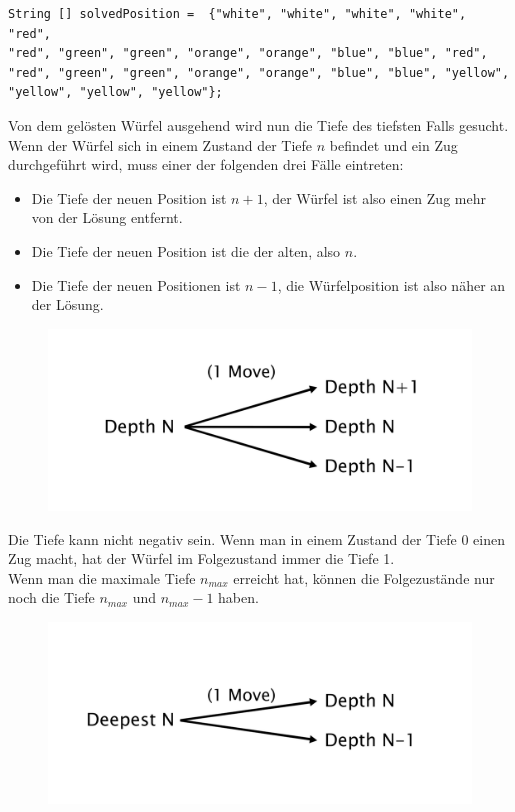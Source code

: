 \documentclass[12pt,a4paper, usenames, dvipsnames]{scrartcl}
\begin{document}
\begin{verbatim}
String [] solvedPosition =  {"white", "white", "white", "white", "red", 
"red", "green", "green", "orange", "orange", "blue", "blue", "red", 
"red", "green", "green", "orange", "orange", "blue", "blue", "yellow", 
"yellow", "yellow", "yellow"};
\end{verbatim}
Von dem gelösten Würfel ausgehend wird nun die Tiefe des tiefsten Falls gesucht. \\
Wenn der Würfel sich in einem Zustand der Tiefe $n$ befindet und ein Zug durchgeführt wird, muss einer der folgenden drei Fälle eintreten:
\begin{itemize}
	\item Die Tiefe der neuen Position ist $n+1$, der Würfel ist also einen Zug mehr von der Lösung entfernt.
	\item Die Tiefe der neuen Position ist die der alten, also $n$.
	\item Die Tiefe der neuen Positionen ist $n-1$, die Würfelposition ist also näher an der Lösung.
\end{itemize}
\begin{figure}[h]
\centering
\includegraphics[scale=0.19]{graphDepth.png}
\end{figure}
Die Tiefe kann nicht negativ sein. Wenn man in einem Zustand der Tiefe $0$ einen Zug macht, hat der Würfel im Folgezustand immer die Tiefe 1. \\
Wenn man die maximale Tiefe $n_{max}$ erreicht hat, können die Folgezustände nur noch die Tiefe $n_{max}$ und $n_{max} -1$ haben. 
\begin{figure}[h]
\centering
\includegraphics[scale=0.2]{graphDepthN.png}
\end{figure}
\end{document}
